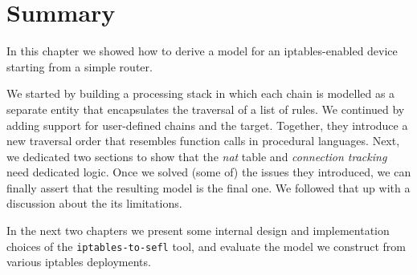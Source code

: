 \section{Summary}
In this chapter we showed how to derive a model for an iptables-enabled device
starting from a simple router.

We started by building a processing stack in which each chain is modelled as a
separate entity that encapsulates the traversal of a list of rules.  We
continued by adding support for user-defined chains and the \RETURN target.
Together, they introduce a new traversal order that resembles function calls in
procedural languages.  Next, we dedicated two sections to show that the
\emph{nat} table and \emph{connection tracking} need dedicated logic.  Once we
solved (some of) the issues they introduced, we can finally assert that the
resulting model is the final one.  We followed that up with a discussion about
the its limitations.

In the next two chapters we present some internal design and implementation
choices of the \texttt{iptables-to-sefl} tool, and evaluate the model we
construct from various iptables deployments.
